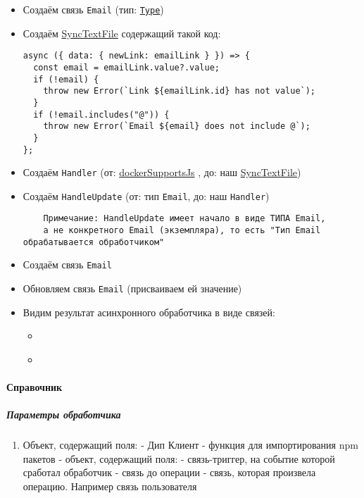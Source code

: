 \documentclass{article}
\begin{document}
\begin{itemize}
  \item Создаём связь \texttt{Email} (тип: \texttt{\hyperlink{type.Def}{Type}})
  \item Создаём \hyperlink{SyncTextFile.Def}{SyncTextFile} содержащий такой
        код:
        \begin{lstlisting}
async ({ data: { newLink: emailLink } }) => {
  const email = emailLink.value?.value;
  if (!email) {
    throw new Error(`Link ${emailLink.id} has not value`);
  }
  if (!email.includes("@")) {
    throw new Error(`Email ${email} does not include @`);
  }
};
\end{lstlisting}
  \item Создаём \texttt{Handler} (от:
        \hyperlink{dockerSupportsJs.Def}{dockerSupportsJs} , до: наш
        \hyperlink{SyncTextFile.Def}{SyncTextFile})
  \item Создаём \texttt{HandleUpdate} (от: тип \texttt{Email}, до: наш
        \texttt{Handler})
        \begin{verbatim}
    Примечание: HandleUpdate имеет начало в виде ТИПА Email,
    а не конкретного Email (экземпляра), то есть "Тип Email обрабатывается обработчиком"
    \end{verbatim}
  \item Создаём связь \texttt{Email}
  \item Обновляем связь \texttt{Email} (присваиваем ей значение)
  \item Видим результат асинхронного обработчика в виде связей:
        \begin{itemize}
          \item \begin{handler_success_result_info}
                \end{handler_success_result_info}\\

          \item \begin{handler_fail_result_info}
                \end{handler_fail_result_info}\\
        \end{itemize}
\end{itemize}

\paragraph{Справочник}
\subparagraph{Параметры обработчика}
\begin{enumerate}
  \item Объект, содержащий поля:
         - Дип Клиент
         - функция для импортирования npm пакетов
         - объект, содержащий поля:
         - связь-триггер, на событие которой сработал
        обработчик
         - связь до операции
         - связь, которая произвела операцию.
        Например связь пользователя
\end{enumerate}
\end{document}
